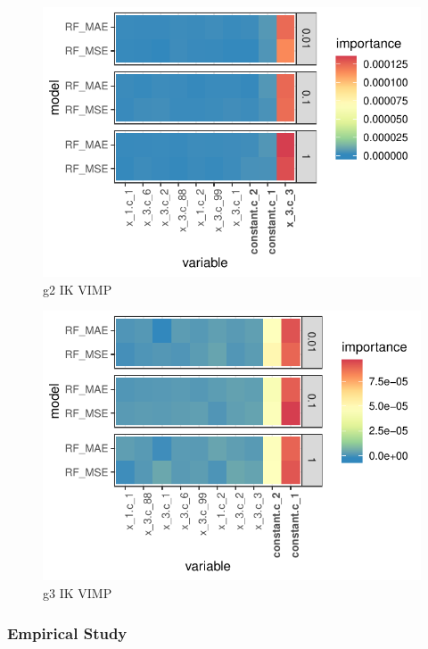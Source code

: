 \documentclass[11pt, a4paper, table]{article}
\begin{document}
\begin{figure}
	\includegraphics[]{../Results/simulation/graphics/simulation_g2_vimp_ik.pdf}
	\caption{g2 IK VIMP}
\end{figure}

\begin{figure}
	\includegraphics[]{../Results/simulation/graphics/simulation_g3_vimp_ik.pdf}
	\caption{g3 IK VIMP}
\end{figure}

\subsubsection{Empirical Study}


\end{document}

